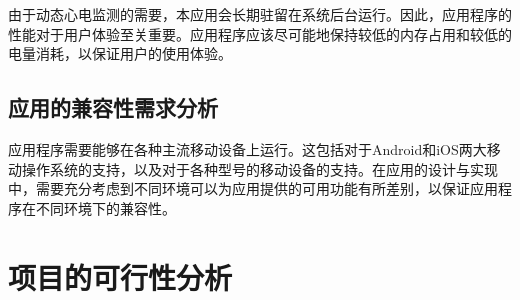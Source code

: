 由于动态心电监测的需要，本应用会长期驻留在系统后台运行。因此，应用程序的性能对于用户体验至关重要。应用程序应该尽可能地保持较低的内存占用和较低的电量消耗，以保证用户的使用体验。

\subsection{应用的兼容性需求分析}\label{subsec:compatibility}

应用程序需要能够在各种主流移动设备上运行。这包括对于Android和iOS两大移动操作系统的支持，以及对于各种型号的移动设备的支持。在应用的设计与实现中，需要充分考虑到不同环境可以为应用提供的可用功能有所差别，以保证应用程序在不同环境下的兼容性。


\section{项目的可行性分析}\label{sec:feasibility}

